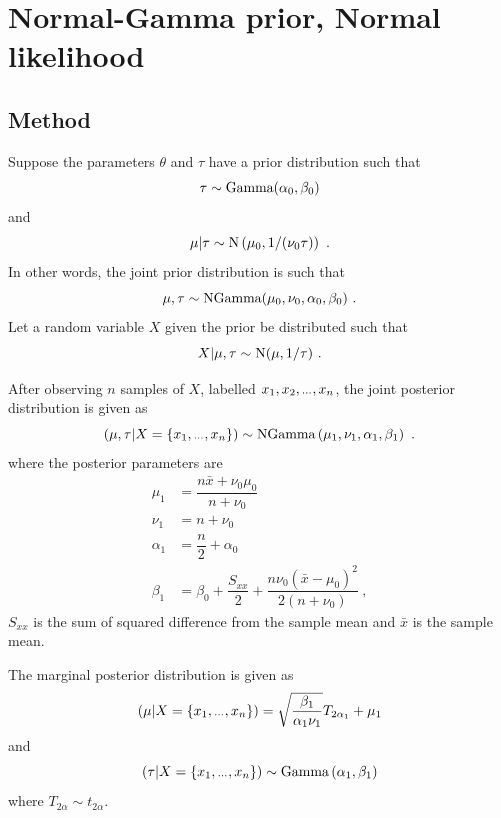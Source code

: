 \documentclass[a4paper]{proc}
\newcommand{\dotdotdot}{\vphantom{.}_{\cdots}}
\begin{document}
\section{Normal-Gamma prior, Normal likelihood}

\subsection{Method}
Suppose the parameters $\theta$ and $\tau$ have a prior distribution such that
\begin{equation}
\tau\sim\textup{Gamma}(\alpha_0,\beta_0)
\end{equation}
and
\begin{equation}
\mu|\tau\sim\textup{N}\left(\mu_0,1/(\nu_0\tau)\right) \ .
\end{equation}
In other words, the joint prior distribution is such that
\begin{equation}
\mu,\tau\sim\textup{NGamma}(\mu_0,\nu_0,\alpha_0,\beta_0) \ .
\end{equation}
Let a random variable $X$ given the prior be distributed such that
\begin{equation}
X|\mu,\tau\sim\textup{N}(\mu,1/\tau) \ .
\end{equation}

After observing $n$ samples of $X$, labelled $x_1,x_2,\dotdotdot ,x_n$, the joint posterior distribution is given as
\begin{equation}
(\mu,\tau|X=\{x_1,\dotdotdot ,x_n\})\sim\textup{NGamma}
\left(
	\mu_1,
	\nu_1,
	\alpha_1,
	\beta_1
\right) \ .
\end{equation}
where the posterior parameters are
\begin{align}
\mu_1 &= \dfrac{n\bar{x}+\nu_0\mu_0}{n+\nu_0} \\
\nu_1 &= n+\nu_0 \\
\alpha_1 &= \dfrac{n}{2}+\alpha_0 \\
\beta_1 &= \beta_0+\dfrac{S_{xx}}{2}+\dfrac{n\nu_0(\bar{x}-\mu_0)^2}{2(n+\nu_0)} \ ,
\end{align}
$S_{xx}$ is the sum of squared difference from the sample mean and $\bar{x}$ is the sample mean.

The marginal posterior distribution is given as
\begin{equation}
(\mu|X=\{x_1,\dotdotdot ,x_n\}) = \sqrt{\dfrac{\beta_1}{\alpha_1\nu_1}} T_{2\alpha_1}
+ \mu_1
\end{equation}
and
\begin{equation}
(\tau|X=\{x_1,\dotdotdot ,x_n\}) \sim \textup{Gamma}\left(
\alpha_1,\beta_1
\right)
\end{equation}
where $T_{2\alpha}\sim t_{2\alpha}$.
\end{document}

